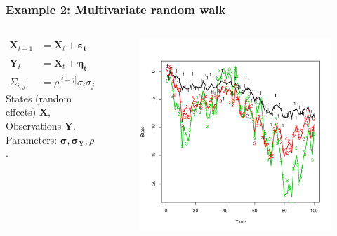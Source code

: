 \documentclass[compress]{beamer}
\newcommand{\mb}[1]{\mathbf{#1}}
\begin{document}
\begin{frame}
  \frametitle{Example 2: Multivariate random walk}
\begin{columns}
    \begin{column}{0.5\textwidth}
      \begin{align*}
        \mb{X}_{t+1} &= \mb{X}_t + \mb{\varepsilon_t} \quad , \mb{\varepsilon_t} \sim N(\mb{0},\Sigma) \\
        \mb{Y}_t &= \mb{X}_t + \mb{\eta_t} \quad , \mb{\eta_t} \sim N(\mb{0},\mb{\sigma}_Y^2 \mb{I}) \\
           \Sigma_{i,j} & = \rho^{|i-j|}\sigma_{i}\sigma_{j}  
      \end{align*} 
     States (random effects) $\mb{X}$, Observations $\mb{Y}$.  
     Parameters: $\mb{\sigma}, \mb{\sigma_Y}, \rho$.
      
    \end{column}
    
    \begin{column}{0.5\textwidth} 
    \begin{figure}[!htb]
      \centering
      \includegraphics[width=1.0\textwidth]{results/rwplot.pdf}
    \end{figure}

  \end{column}
\end{columns}
\end{frame}
\end{document}

